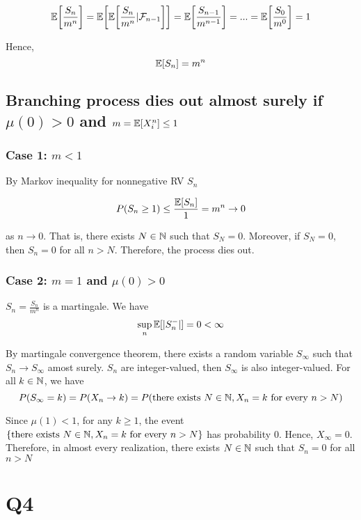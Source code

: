 \documentclass{article}
\begin{document}
\begin{align*}
	\Exp\bracket*{\frac{S_n}{m^n}} =  \Exp\bracket*{\Exp\bracket*{\frac{S_n}{m^n} | \mathcal{F}_{n-1}}} = \Exp\bracket*{\frac{S_{n-1}}{m^{n-1}}} = ... = \Exp\bracket*{\frac{S_0}{m^0}} = 1
\end{align*}

Hence,
$$
	\mathbb{E}[S_n] = m^n
$$

\subsection{Branching process dies out almost surely if $\mu(0) > 0$ and $m = \mathbb{E}[X_i^n] \leq 1$}

\subsubsection{Case 1: $m < 1$}

By Markov inequality for nonnegative RV $S_n$

\begin{align*}
	P(S_n \geq 1) \leq \frac{\mathbb{E}[S_n]}{1} = m^n \to 0
\end{align*}

as $n \to 0$.  That is, there exists $N \in \mathbb{N}$ such that $S_N = 0$.  Moreover, if $S_N = 0$, then $S_n = 0$ for all $n > N$. Therefore, the process dies out.

\subsubsection{Case 2: $m = 1$ and $\mu(0) > 0$}

$S_n = \frac{S_n}{m^n}$ is a martingale. We have
$$
	\sup_{n} \mathbb{E}[|S_n^-|] = 0 < \infty
$$

By martingale convergence theorem, there exists a random variable $S_\infty$ such that $S_n \to S_\infty$ amost surely. $S_n$ are integer-valued, then $S_\infty$ is also integer-valued. For all $k \in \mathbb{N}$, we have
$$
	P(S_\infty = k) = P(X_n \to k) = P(\text{there exists } N \in \mathbb{N}, X_n = k \text{ for every } n > N)
$$

Since $\mu(1) < 1$,  for any $k \geq 1$, the event $\{\text{there exists } N \in \mathbb{N}, X_n = k \text{ for every } n > N\}$ has probability $0$. Hence, $X_\infty = 0$. Therefore, in almost every realization, there exists $N \in \mathbb{N}$ such that $S_n = 0$ for all $n > N$

\section{Q4}
\end{document}
